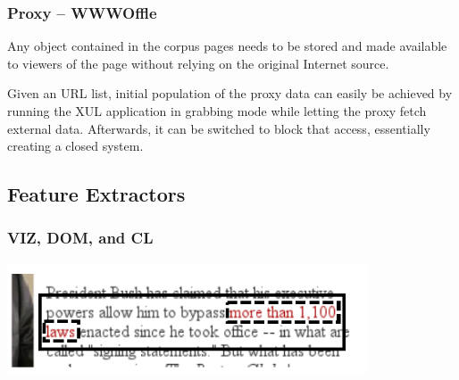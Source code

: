 \documentclass{beamer}
\begin{document}
        \begin{frame}
            \frametitle{Proxy -- WWWOffle}
            \begin{block}{}
                Any object contained in the corpus pages needs to be stored and made available to viewers of the page without relying on the original Internet source.

                \medskip
                Given an URL list, initial population of the proxy data can easily be achieved by running the XUL application in grabbing mode while letting the proxy fetch external data.
                Afterwards, it can be switched to block that access, essentially creating a closed system.
            \end{block}
        \end{frame}

    \subsection{Feature Extractors}

        \begin{frame}
            \frametitle{VIZ, DOM, and CL}
            \begin{center}
                \includegraphics[width=0.8\textwidth]{vizwrap}
            \end{center}
            \medskip
            \begin{block}{}
                {}
            \end{block}
        \end{frame}
        
\end{document}

